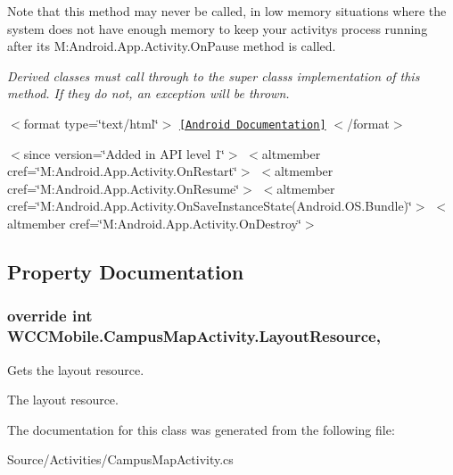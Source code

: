 Note that this method may never be called, in low memory situations where the system does not have enough memory to keep your activity\textquotesingle{}s process running after its {\ttfamily M\+:\+Android.\+App.\+Activity.\+On\+Pause} method is called. 

{\itshape Derived classes must call through to the super class\textquotesingle{}s implementation of this method. If they do not, an exception will be thrown.} 

$<$format type=\char`\"{}text/html\char`\"{}$>$ \href{http://developer.android.com/reference/android/app/Activity.html#onStop()}{\tt \mbox{[}Android Documentation\mbox{]}} $<$/format$>$ 

$<$since version=\char`\"{}\+Added in A\+P\+I level 1\char`\"{}$>$ $<$altmember cref=\char`\"{}\+M\+:\+Android.\+App.\+Activity.\+On\+Restart\char`\"{}$>$ $<$altmember cref=\char`\"{}\+M\+:\+Android.\+App.\+Activity.\+On\+Resume\char`\"{}$>$ $<$altmember cref=\char`\"{}\+M\+:\+Android.\+App.\+Activity.\+On\+Save\+Instance\+State(\+Android.\+O\+S.\+Bundle)\char`\"{}$>$ $<$altmember cref=\char`\"{}\+M\+:\+Android.\+App.\+Activity.\+On\+Destroy\char`\"{}$>$ 

\subsection{Property Documentation}
\subsubsection[{\texorpdfstring{Layout\+Resource}{LayoutResource}}]{\setlength{\rightskip}{0pt plus 5cm}override int W\+C\+C\+Mobile.\+Campus\+Map\+Activity.\+Layout\+Resource\hspace{0.3cm}{\ttfamily [get]}, {\ttfamily [protected]}}\hypertarget{class_w_c_c_mobile_1_1_campus_map_activity_ac93753471d106f992c78e927d3f87d1f}{}\label{class_w_c_c_mobile_1_1_campus_map_activity_ac93753471d106f992c78e927d3f87d1f}


Gets the layout resource. 

The layout resource. 

The documentation for this class was generated from the following file\+:\begin{DoxyCompactItemize}
\item 
Source/\+Activities/Campus\+Map\+Activity.\+cs\end{DoxyCompactItemize}
